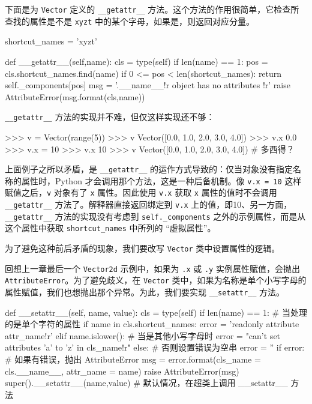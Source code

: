 下面是为 \texttt{Vector} 定义的 \texttt{\_\_getattr\_\_} 方法。这个方法的作用很简单，它检查所查找的属性是不是 \texttt{xyzt} 中的某个字母，如果是，则返回对应分量。

\begin{python}
shortcut_names = 'xyzt'

def __getattr__(self,name):
    cls = type(self)
    if len(name) == 1:
        pos = cls.shortcut_names.find(name)
        if 0 <= pos < len(shortcut_names):
            return self._components[pos]
    msg = '{.__name__!r} object has no attributes {!r}'
    raise AttributeError(msg.format(cls,name))
\end{python}

\texttt{\_\_getattr\_\_} 方法的实现并不难，但仅这样实现还不够：

\begin{python}
>>> v = Vector(range(5))
>>> v
Vector([0.0, 1.0, 2.0, 3.0, 4.0])
>>> v.x
0.0
>>> v.x = 10
>>> v.x
10
>>> v
Vector([0.0, 1.0, 2.0, 3.0, 4.0])   # 多西得？
\end{python}

上面例子之所以矛盾，是 \texttt{\_\_getattr\_\_} 的运作方式导致的：仅当对象没有指定名称的属性时，Python 才会调用那个方法，这是一种后备机制。像 \texttt{v.x = 10} 这样赋值之后，\texttt{v} 对象有了 \texttt{x} 属性。因此使用 \texttt{v.x} 获取 \texttt{x} 属性的值时不会调用 \texttt{\_\_getattr\_\_} 方法了。解释器直接返回绑定到 \texttt{v.x} 上的值，即10、另一方面， \texttt{\_\_getattr\_\_} 方法的实现没有考虑到 \texttt{self.\_components} 之外的示例属性，而是从这个属性中获取 \texttt{shortcut\_names} 中所列的 ``虚拟属性''。

为了避免这种前后矛盾的现象，我们要改写 \texttt{Vector} 类中设置属性的逻辑。

回想上一章最后一个 \texttt{Vector2d} 示例中，如果为 \texttt{.x} 或 \texttt{.y} 实例属性赋值，会抛出 \texttt{AttributeError}。为了避免歧义，在 \texttt{Vector} 类中，如果为名称是单个小写字母的属性赋值，我们也想抛出那个异常。为此，我们要实现 \texttt{\_\_setattr\_\_} 方法。

\begin{python}
def __setattr__(self, name, value):
    cls = type(self)
    if len(name) == 1:  # 当处理的是单个字符的属性
        if name in cls.shortcut_names:
            error = 'readonly attribute {attr_name!r}'
        elif name.islower():    # 当是其他小写字母时
            error = "can't set attributes 'a' to 'z' in {cls_name!r}"
        else:           # 否则设置错误为空串
            error = ''
        if error:       # 如果有错误，抛出 AttributeError
            msg = error.format(cls_name = cls.__name__, attr_name = name)
            raise AttributeError(msg)
    super().__setattr__(name,value) # 默认情况，在超类上调用 __setattr__ 方法
\end{python}

